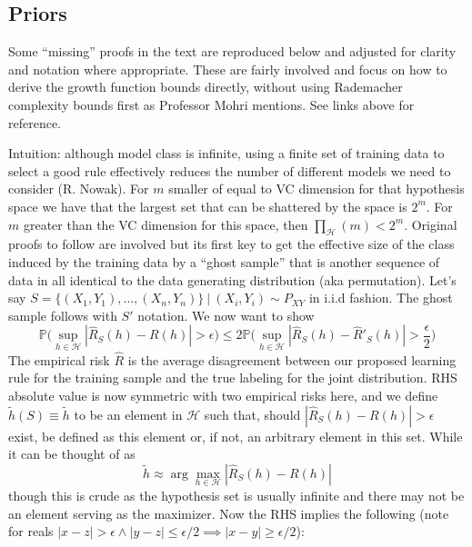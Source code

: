 \begin{flushleft}
	\section{Priors}

	Some ``missing'' proofs in the text are reproduced below and adjusted for
	clarity and notation where appropriate. These are fairly involved and focus on
	how to derive the growth function bounds directly, without using Rademacher
	complexity bounds first as Professor Mohri mentions. See links above for
	reference.

	Intuition: although model class is infinite, using a finite set of training
	data to select a good rule effectively reduces the number of different models
	we need to consider (R. Nowak). For $m$ smaller of equal to VC dimension for
	that hypothesis space we have that the largest set that can be shattered by the
	space is $2^m$. For $m$ greater than the VC dimension for this space, then
	$\prod_{\mathcal{H}}(m) < 2^m$. Original proofs to follow are involved but its
	first key to get the effective size of the class induced by the training data
	by a ``ghost sample'' that is another sequence of data in all identical to the
	data generating distribution (aka permutation). Let's say $S = \{(X_1, Y_1),
		\ldots, (X_n, Y_n)\}~|~(X_i,Y_i) \sim P_{XY}$ in i.i.d fashion. The ghost
	sample follows with $S'$ notation. We now want to show
	$$\mathbb{P}\bigl(\sup_{h \in \mathcal{H}} |\hat{R}_S(h) - R(h)| >
		\epsilon\bigr) \leq 2\mathbb{P}\bigl(\sup_{h \in
			\mathcal{H}}|\hat{R}_S(h)-\hat{R}'_S(h)| > \frac{\epsilon}{2}\bigr)$$ The
	empirical risk $\hat{R}$ is the average disagreement between our proposed
	learning rule for the training sample and the true labeling for the joint
	distribution. RHS absolute value is now symmetric with two empirical risks
	here, and we define $\tilde{h}(S) \equiv \tilde{h}$ to be an element in
	$\mathcal{H}$ such that, should $|\hat{R}_S(h) - R(h)| > \epsilon$ exist, be
	defined as this element or, if not, an arbitrary element in this set. While it
	can be thought of as $$\tilde{h} \approx \arg \max_{h \in \mathcal{H}}
		|\hat{R}_S(h) - R(h)| $$ though this is crude as the hypothesis set is usually
	infinite and there may not be an element serving as the maximizer. Now the RHS
	implies the following (note for reals $|x-z| > \epsilon \wedge |y-z| \leq
		\epsilon/2 \implies |x-y| \geq \epsilon/2$):


\end{flushleft}
